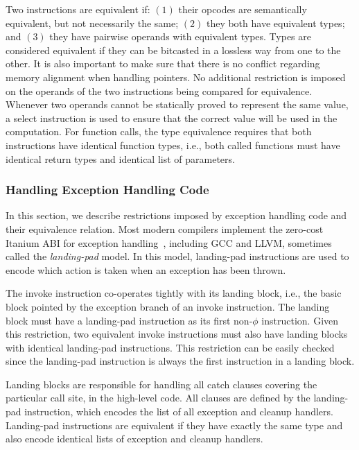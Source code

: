 Two instructions are equivalent if: $(1)$ their opcodes are semantically
equivalent, but not necessarily the same; $(2)$ they both have equivalent types;
and $(3)$ they have pairwise operands with equivalent types.
Types are considered equivalent if they can be bitcasted in a lossless way
from one to the other.
It is also important to make sure that there is no conflict regarding memory
alignment when handling pointers.
No additional restriction is imposed on the operands of the two instructions
being compared for equivalence.
Whenever two operands cannot be statically proved to represent the same value,
a select instruction is used to ensure that the correct value will be used in
the computation.
For function calls, the type equivalence requires that both instructions have
identical function types, i.e., both called functions must have identical
return types and identical list of parameters.

\subsubsection{Handling Exception Handling Code}

In this section, we describe restrictions imposed by exception handling code and
their equivalence relation.
Most modern compilers implement the zero-cost Itanium ABI for exception
handling~\cite{dinechin00}, including GCC and LLVM, sometimes called the
\textit{landing-pad} model.
In this model, landing-pad instructions are used to encode which action is taken
when an exception has been thrown.

The invoke instruction co-operates tightly with its landing block, i.e., the
basic block pointed by the exception branch of an invoke instruction.
The landing block must have a landing-pad instruction as its first non-$\phi$
instruction.
Given this restriction, two equivalent invoke instructions must also have
landing blocks with identical landing-pad instructions.
This restriction can be easily checked since the landing-pad instruction is
always the first instruction in a landing block.

Landing blocks are responsible for handling all catch clauses covering the
particular call site, in the high-level code.
All clauses are defined by the landing-pad instruction, which encodes the list of
all exception and cleanup handlers.
Landing-pad instructions are equivalent if they have exactly the same type and
also encode identical lists of exception and cleanup handlers.

